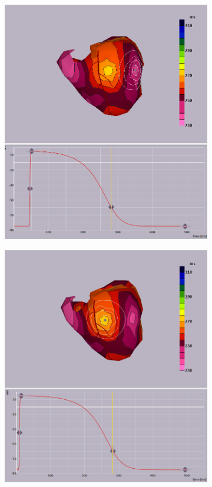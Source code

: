 \documentclass[12pt]{article}
\begin{document}
\begin{figure}[H]
	\centering
	\begin{subfigure}{0.45\textwidth}
		\centering
		\includegraphics[width = \textwidth]{Figures/EpiADP.png}
		\caption{}
		\label{APD:epi}
	\end{subfigure}
	\begin{subfigure}{0.45\textwidth}
	\centering
	\includegraphics[width = \textwidth]{Figures/ADP_check1.png}

\end{subfigure}
\end{figure}
\end{document}
